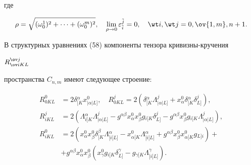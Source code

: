 где 


$$ 


\rho=\sqrt{(\omega^1_0)^2+\dotsb+(\omega^m_0)^2},\quad 


\lim_{\rho\to0}\varepsilon^{\Tilde j}_{\Tilde i}=0,\quad 


\wt i,\wt j=0,\ov{1,m},n+1. 


$$ 


 


В структурных уравнениях (58) компоненты тензора кривизны-кручения 


$R^{\ov j}_{\ov i K L}$ 


пространства $C_{n,m}$ имеют следующее строение: 


\begin{equation} 


\begin{split} 


R^0_{0K L}&=2\delta{}^\alpha_{[K}x{}^0_{|\alpha|L]},\quad 


R^j_{0K L}=2(\delta{}^\alpha_{[K} 


\Lambda{}^j_{|\alpha|L]}+x^0_\alpha 


\delta{}^\alpha_{[K}\delta{}^j_{L]}), \\ 


% 


R^j_{i K L}&=2(\Lambda{}^\alpha_{i[K} 


\Lambda{}^j_{|\alpha|L]}-g^{\alpha\beta}x^0_\alpha 


x^0_\beta g{}_{i[K}\delta{}^j_{L]}-g^{\alpha\beta} 


x^0_\beta g{}_{i[K}\Lambda{}^j_{|\alpha|L]}), \\ 


%


R^0_{i K L}&=2(x^0_\alpha x^0_\beta 


\delta{}^\beta_{[K}\Lambda{}^\alpha_{|i|L]}- 


x^0_{\alpha[K}\Lambda{}^\alpha_{|i|L]}+g^{\alpha\beta} 


x^0_\beta x{}^0_{\alpha[K}g{}_{L]i})+ \\ 


%


\qquad &+g^{\alpha\beta}x^0_\alpha x^0_\beta 


(x^0_\gamma g{}_{i[K}\delta{}^\gamma_{L]}- 


g{}_{\gamma[K}\Lambda{}^\gamma_{|i|L]}). 


\end{split} 


\end{equation} 


